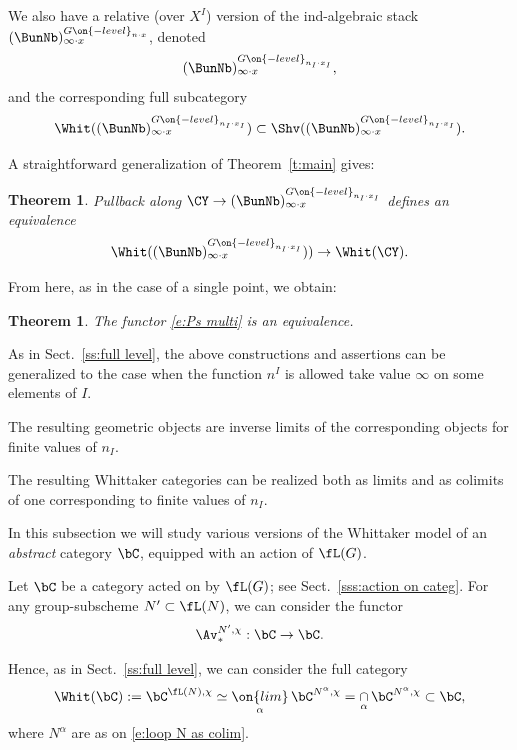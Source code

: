 \documentclass[9pt]{amsart}
\newtheorem{thm}[subsubsection]{Theorem}
\theoremstyle{definition}
\theoremstyle{remark}
\newcommand{\thmref}[1]{Theorem~\ref{#1}}
\newcommand{\secref}[1]{Sect.~\ref{#1}}
\numberwithin{equation}{section}
\begin{document}
\medskip

We also have a relative (over $X^I$) version of the ind-algebraic stack $(\BunNb)^{G\on{-level}_{n \cdot x}}_{\infty\cdot x}$,
denoted
$$(\BunNb)^{G\on{-level}_{n_I\cdot x_I}}_{\infty\cdot x},$$
and the corresponding full subcategory
$$\Whit((\BunNb)^{G\on{-level}_{n_I\cdot x_I}}_{\infty\cdot x})\subset \Shv((\BunNb)^{G\on{-level}_{n_I\cdot x_I}}_{\infty\cdot x}).$$

\medskip

A straightforward generalization of \thmref{t:main} gives:

\begin{thm}
Pullback along $\CY\to (\BunNb)^{G\on{-level}_{n_I\cdot x_I}}_{\infty\cdot x}$ defines an equivalence
$$\Whit((\BunNb)^{G\on{-level}_{n_I\cdot x_I}}_{\infty\cdot x}))\to \Whit(\CY).$$
\end{thm}

From here, as in the case of a single point, we obtain:

\begin{thm}
The functor \eqref{e:Ps multi} is an equivalence.
\end{thm} 

\sssec{}  \label{sss:inf level mult}

As in \secref{ss:full level}, the above constructions and assertions can be generalized to the case when the
function $n^I$ is allowed take value $\infty$ on some elements of $I$. 

\medskip

The resulting geometric objects
are inverse limits of the corresponding objects for finite values of $n_I$. 

\medskip

The resulting Whittaker
categories can be realized both as limits and as colimits of one corresponding to finite values of $n_I$. 


In this subsection we will study various versions of the Whittaker model of an \emph{abstract} category $\bC$, 
equipped with an action of $\fL(G)$. 

\sssec{}

Let $\bC$ be a category acted on by $\fL(G)$; see \secref{sss:action on categ}. For any group-subscheme
$N'\subset \fL(N)$, we can consider the functor
$$\Av^{N',\chi}_*:\bC\to \bC.$$

Hence, as in \secref{ss:full level}, we can consider the full category
$$\Whit(\bC):=\bC^{\fL(N),\chi}\simeq \underset{\alpha}{\on{lim}}\, \bC^{N^\alpha,\chi}=
\underset{\alpha}\cap\, \bC^{N^\alpha,\chi}\subset \bC,$$
where $N^\alpha$ are as on \eqref{e:loop N as colim}. 
\end{document}
